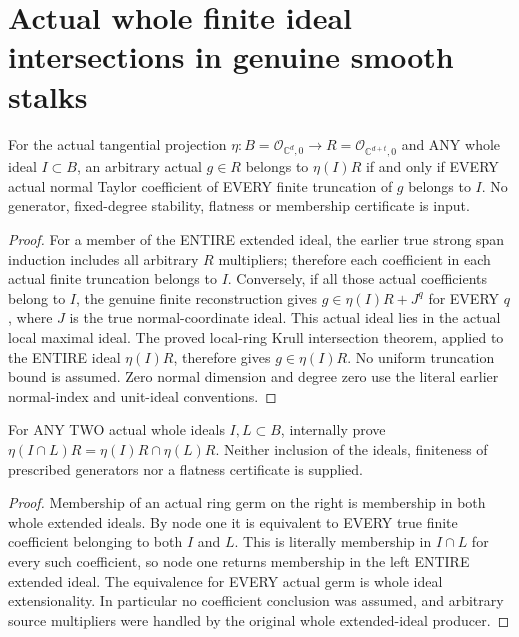 \section{Actual whole finite ideal intersections in genuine smooth stalks}

\begin{theorem}
\label{hir:submersion-finite-intersection-whole-coefficients}
\leanok
For the actual tangential projection $\eta:B=\mathcal O_{\mathbb C^d,0}\to
R=\mathcal O_{\mathbb C^{d+t},0}$ and ANY whole ideal $I\subset B$, an
arbitrary actual $g\in R$ belongs to $\eta(I)R$ if and only if EVERY actual
normal Taylor coefficient of EVERY finite truncation of $g$ belongs to $I$.
No generator, fixed-degree stability, flatness or membership certificate is input.
\end{theorem}
\begin{proof}
For a member of the ENTIRE extended ideal, the earlier true strong span
induction includes all arbitrary $R$ multipliers; therefore each coefficient
in each actual finite truncation belongs to $I$. Conversely, if all those
actual coefficients belong to $I$, the genuine finite reconstruction gives
$g\in\eta(I)R+J^q$ for EVERY $q$, where $J$ is the true normal-coordinate
ideal. This actual ideal lies in the actual local maximal ideal. The proved
local-ring Krull intersection theorem, applied to the ENTIRE ideal
$\eta(I)R$, therefore gives $g\in\eta(I)R$. No uniform truncation bound is
assumed. Zero normal dimension and degree zero use the literal earlier
normal-index and unit-ideal conventions.
\end{proof}

\begin{theorem}
\label{hir:submersion-finite-intersection-binary}
\leanok
For ANY TWO actual whole ideals $I,L\subset B$, internally prove
$\eta(I\cap L)R=\eta(I)R\cap\eta(L)R$. Neither inclusion of the ideals,
finiteness of prescribed generators nor a flatness certificate is supplied.
\end{theorem}
\begin{proof}
Membership of an actual ring germ on the right is membership in both
whole extended ideals. By node one it is equivalent to EVERY true finite
coefficient belonging to both $I$ and $L$. This is literally membership in
$I\cap L$ for every such coefficient, so node one returns membership in
the left ENTIRE extended ideal. The equivalence for EVERY actual germ is
whole ideal extensionality. In particular no coefficient conclusion was
assumed, and arbitrary source multipliers were handled by the original
whole extended-ideal producer.
\end{proof}

